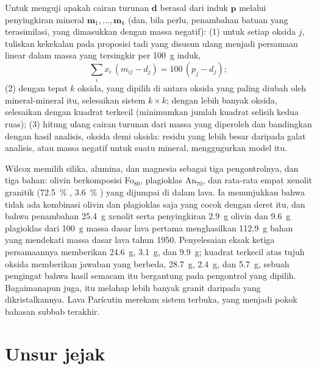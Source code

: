 \begin{method}\label{met:b2:magmatic-differentiation:massbalance}
Untuk menguji apakah cairan turunan $\mathbf d$ berasal dari  induk $\mathbf p$ melalui
penyingkiran mineral $\mathbf m_1, \dots, \mathbf m_k$ (dan, bila perlu, penambahan
batuan yang terasimilasi, yang dimasukkan dengan massa negatif): (1) untuk setiap oksida $j$, tuliskan
kekekalan pada proposisi tadi yang disusun ulang menjadi persamaan linear dalam massa yang
tersingkir per \qty{100}{g}  induk,
\[
\sum_i x_i\,(m_{ij} - d_j) = 100\,(p_j - d_j);
\]
(2) dengan tepat $k$ oksida, yang dipilih di antara oksida yang paling diubah oleh mineral-mineral itu, selesaikan
sistem $k \times k$; dengan lebih banyak oksida, selesaikan dengan kuadrat terkecil (minimumkan jumlah
kuadrat selisih kedua ruas); (3) hitung ulang cairan turunan dari
massa yang diperoleh dan bandingkan dengan hasil analisis, oksida demi oksida: residu yang lebih besar
daripada galat analisis, atau massa negatif untuk suatu mineral, menggugurkan model itu.
\end{method}

Wilcox memilih silika, alumina, dan magnesia sebagai tiga pengontrolnya, dan tiga
bahan: olivin berkomposisi Fo$_{80}$, plagioklas An$_{70}$, dan rata-rata
empat xenolit granitik (\qty{72.5}{\percent} , \qty{3.6}{\percent}
) yang dijumpai di dalam lava. Ia menunjukkan bahwa tidak ada kombinasi olivin dan
plagioklas saja yang cocok dengan deret itu, dan bahwa penambahan \qty{25.4}{g} xenolit serta
penyingkiran \qty{2.9}{g} olivin dan \qty{9.6}{g} plagioklas dari
\qty{100}{g} massa dasar lava pertama menghasilkan \qty{112.9}{g} bahan yang
mendekati massa dasar lava tahun 1950. Penyelesaian eksak ketiga persamaannya
memberikan \qty{24.6}{g}, \qty{3.1}{g}, dan \qty{9.9}{g}; kuadrat terkecil atas tujuh oksida
memberikan jawaban yang berbeda, \qty{28.7}{g}, \qty{2.4}{g}, dan \qty{5.7}{g}, sebuah pengingat
bahwa hasil semacam itu bergantung pada pengontrol yang dipilih. Bagaimanapun juga,  itu melahap lebih banyak
granit daripada yang dikristalkannya. Lava Parícutin merekam sistem terbuka, yang menjadi
pokok bahasan subbab terakhir.

\section{Unsur jejak}\label{sec:b2:magmatic-differentiation:trace}


